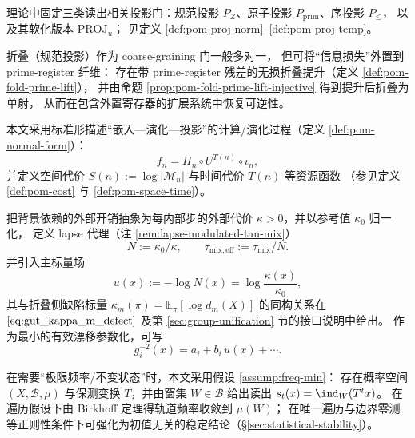 \begin{hdefinition}[三投影读出与顺序投影]\label{def:appH0-three-projections}
理论中固定三类读出相关投影门：规范投影 \(P_Z\)、原子投影 \(P_{\mathrm{prim}}\)、序投影 \(P_{\le}\)，
以及其软化版本 \(\mathrm{PROJ}_u\)；
见定义 \ref{def:pom-proj-norm}--\ref{def:pom-proj-temp}。
\end{hdefinition}

\begin{hdefinition}[信息外置与守恒型精化]\label{def:appH0-information-externalization}
折叠（规范投影）作为 coarse-graining 门一般多对一，
但可将“信息损失”外置到 prime-register 纤维：
存在带 prime-register 残差的无损折叠提升（定义 \ref{def:pom-fold-prime-lift}），
并由命题 \ref{prop:pom-fold-prime-lift-injective} 得到提升后折叠为单射，
从而在包含外置寄存器的扩展系统中恢复可逆性。
\end{hdefinition}

\begin{hdefinition}\label{def:appH0-resources}
本文采用标准形描述“嵌入—演化—投影”的计算/演化过程（定义 \ref{def:pom-normal-form}）：
\[
f_n=\Pi_n\circ U^{T(n)}\circ \iota_n,
\]
并定义空间代价 \(S(n):=\log|\mathcal{M}_n|\) 与时间代价 \(T(n)\) 等资源函数
（参见定义 \ref{def:pom-cost} 与 \ref{def:pom-space-time}）。
\end{hdefinition}

\begin{hdefinition}\label{def:appH0-lapse-proxy}
把背景依赖的外部开销抽象为每内部步的外部代价 \(\kappa>0\)，并以参考值 \(\kappa_0\) 归一化，
定义 lapse 代理（注 \ref{rem:lapse-modulated-tau-mix}）
\[
N:=\kappa_0/\kappa,
\qquad
\tau_{\mathrm{mix,eff}}:=\tau_{\mathrm{mix}}/N.
\]
并引入主标量场
\[
u(x):=-\log N(x)=\log\frac{\kappa(x)}{\kappa_0},
\]
其与折叠侧缺陷标量 \(\kappa_m(\pi)=\mathbb{E}_{\pi}[\log d_m(X)]\) 的同构关系在
\(\eqref{eq:gut_kappa_m_defect}\) 及第 \ref{sec:group-unification} 节的接口说明中给出。
作为最小的有效漂移参数化，可写
\[
g_i^{-2}(x)=a_i+b_i\,u(x)+\cdots.
\]
\end{hdefinition}

\begin{hdefinition}\label{def:appH0-ergodic-stability}
在需要“极限频率/不变状态”时，本文采用假设 \ref{assump:freq-min}：
存在概率空间 \((X,\mathcal{B},\mu)\) 与保测变换 \(T\)，并由窗集 \(W\in\mathcal{B}\) 给出读出
\(
s_t(x)=\ind_W(T^t x)
\)。
在遍历假设下由 Birkhoff 定理得轨道频率收敛到 \(\mu(W)\)；
在唯一遍历与边界零测等正则性条件下可强化为初值无关的稳定结论（\S\ref{sec:statistical-stability}）。
\end{hdefinition}

